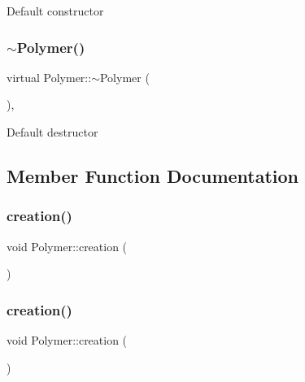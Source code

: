 Default constructor \mbox{\label{classPolymer_aac2b3983f375a5691c7d5ca1a79594d5}} 
\subsubsection{\texorpdfstring{$\sim$\+Polymer()}{~Polymer()}\hspace{0.1cm}{\footnotesize\ttfamily [11/11]}}
{\footnotesize\ttfamily virtual Polymer\+::$\sim$\+Polymer (\begin{DoxyParamCaption}{ }\end{DoxyParamCaption})\hspace{0.3cm}{\ttfamily [inline]}, {\ttfamily [virtual]}}

Default destructor 

\subsection{Member Function Documentation}
\mbox{\label{classPolymer_a1daba3eb2ba8428bf2f3e814668b155f}} 
\subsubsection{\texorpdfstring{creation()}{creation()}\hspace{0.1cm}{\footnotesize\ttfamily [1/10]}}
{\footnotesize\ttfamily void Polymer\+::creation (\begin{DoxyParamCaption}{ }\end{DoxyParamCaption})\hspace{0.3cm}{\ttfamily [inline]}}

\mbox{\label{classPolymer_a1daba3eb2ba8428bf2f3e814668b155f}} 
\subsubsection{\texorpdfstring{creation()}{creation()}\hspace{0.1cm}{\footnotesize\ttfamily [2/10]}}
{\footnotesize\ttfamily void Polymer\+::creation (\begin{DoxyParamCaption}{ }\end{DoxyParamCaption})\hspace{0.3cm}{\ttfamily [inline]}}

